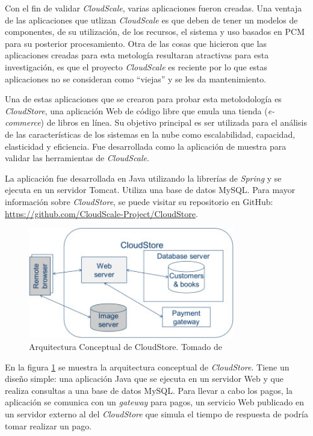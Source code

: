 \documentclass[article]{IEEEtran}
\begin{document}
Con el fin de validar \emph{CloudScale}, varias aplicaciones fueron creadas. Una ventaja de las aplicaciones que utlizan \emph{CloudScale} es que deben de tener un modelos de componentes, de su utilización, de los recursos, el sistema y uso basados en PCM para su posterior procesamiento. Otra de las cosas que hicieron que las aplicaciones creadas para esta metología resultaran atractivas para esta investigación, es que el proyecto \emph{CloudScale} es reciente por lo que estas aplicaciones no se consideran como ``viejas'' y se les da mantenimiento.

Una de estas aplicaciones que se crearon para probar esta metolodología es \emph{CloudStore}, una aplicación Web de código libre que emula una tienda (\emph{e-commerce}) de libros en línea. Su objetivo principal es ser utilizada para el análisis de las características de los sistemas en la nube como escalabilidad, capacidad, elasticidad y eficiencia. Fue desarrollada como la aplicación de muestra para validar las herramientas de \emph{CloudScale}. 

La aplicación fue desarrollada en Java utilizando la librerías de \emph{Spring} y se ejecuta en un servidor Tomcat. Utiliza una base de datos MySQL. Para mayor información sobre \emph{CloudStore}, se puede visitar su repositorio en GitHub: \url{https://github.com/CloudScale-Project/CloudStore}.

\begin{figure}[h]
  \centering
  \includegraphics[width=9cm]{conceptual-cloudstore-architecture}
  \caption{\small{Arquitectura Conceptual de CloudStore. Tomado de \cite{cloudscale-2}}}
  \label{fig:cloudstore-conceptual}
\end{figure}

En la figura \ref{fig:cloudstore-conceptual} se muestra la arquitectura conceptual de \emph{CloudStore}. Tiene un diseño simple: una aplicación Java que se ejecuta en un servidor Web y que realiza consultas a una base de datos MySQL. Para llevar a cabo los pagos, la aplicación se comunica con un \emph{gateway} para pagos, un servicio Web publicado en un servidor externo al del \emph{CloudStore} que simula el tiempo de respuesta de podría tomar realizar un pago.
\end{document}
